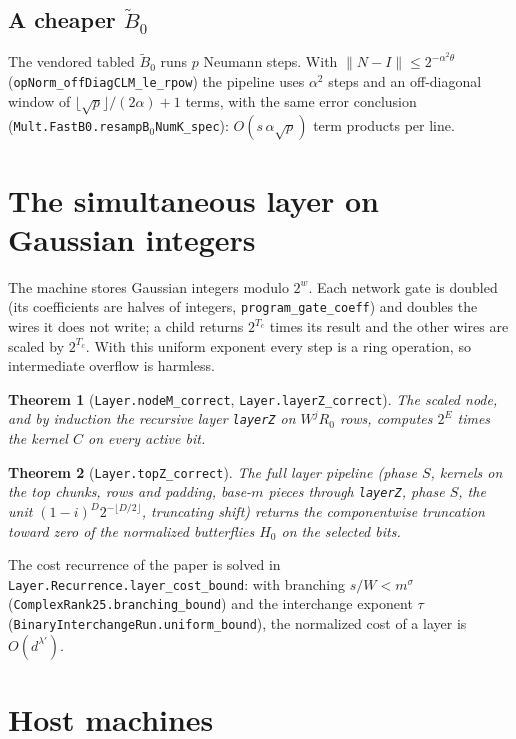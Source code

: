 \documentclass[11pt]{amsart}
\newtheorem{theorem}{Theorem}
\theoremstyle{remark}
\begin{document}
\subsection*{A cheaper $\widetilde B_0$}
The vendored tabled $\widetilde B_0$ runs $p$ Neumann steps. With
$\|N-I\|\le 2^{-\alpha^2\theta}$ (\texttt{opNorm\_offDiagCLM\_le\_rpow}) the pipeline uses
$\alpha^2$ steps and an off-diagonal window of $\lfloor\sqrt p\rfloor/(2\alpha)+1$ terms, with the
same error conclusion (\texttt{Mult.FastB0.resampB}$_0$\texttt{NumK\_spec}): $O(s\,\alpha\sqrt p)$ term
products per line.

\section{The simultaneous layer on Gaussian integers}

The machine stores Gaussian integers modulo $2^w$. Each network gate is doubled (its
coefficients are halves of integers, \texttt{program\_gate\_coeff}) and doubles the wires it does
not write; a child returns $2^{T_c}$ times its result and the other wires are scaled by
$2^{T_c}$. With this uniform exponent every step is a ring operation, so intermediate overflow is
harmless.

\begin{theorem}[\texttt{Layer.nodeM\_correct}, \texttt{Layer.layerZ\_correct}]
The scaled node, and by induction the recursive layer \texttt{layerZ} on $W^jR_0$ rows, computes
$2^{E}$ times the kernel $C$ on every active bit.
\end{theorem}

\begin{theorem}[\texttt{Layer.topZ\_correct}]
The full layer pipeline (phase $S$, kernels on the top chunks, rows and padding, base-$m$ pieces
through \texttt{layerZ}, phase $S$, the unit $(1-i)^D2^{-\lfloor D/2\rfloor}$, truncating shift)
returns the componentwise truncation toward zero of the normalized butterflies $H_0$ on the
selected bits.
\end{theorem}

The cost recurrence of the paper is solved in \texttt{Layer.Recurrence.layer\_cost\_bound}:
with branching $s/W<m^\sigma$ (\texttt{ComplexRank25.branching\_bound}) and the interchange
exponent $\tau$ (\texttt{BinaryInterchangeRun.uniform\_bound}), the normalized cost of a layer is
$O(d^{\lambda'})$.

\section{Host machines}
\end{document}
